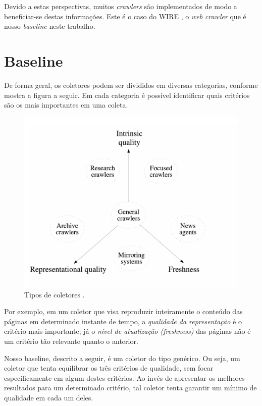 \documentclass[a4paper,12pt,titlepage]{article}
\begin{document}
Devido a estas perspectivas, muitos \textit{crawlers} são implementados de modo a beneficiar-se destas informações. Este é o caso do WIRE \cite{carlos}, o \textit{web crawler} que é nosso \textit{baseline} neste trabalho. 

\section{Baseline}

De forma geral, os coletores podem ser divididos em diversas categorias, conforme mostra a figura a seguir. Em cada categoria é possível identificar quais critérios são os mais importantes em uma coleta. 

\begin{figure}[H]
     \centering
     \includegraphics[scale=0.5]{figures/crawlers-types.png}
     \caption{Tipos de coletores \cite{carlos}.}
     \label{bsp}
\end{figure}

Por exemplo, em um coletor que visa reproduzir inteiramente o conteúdo das páginas em determinado instante de tempo, a \textit{qualidade da representação} é o critério mais importante; já o \textit{nível de atualização (freshness)} das páginas não é um critério tão relevante quanto o anterior. 

Nosso baseline, descrito a seguir, é um coletor do tipo genérico. Ou seja, um coletor que tenta equilibrar os três critérios de qualidade, sem focar especificamente em algum destes critérios. Ao invés de apresentar os melhores resultados para um determinado critério, tal coletor tenta garantir um mínimo de qualidade em cada um deles.
\end{document}
